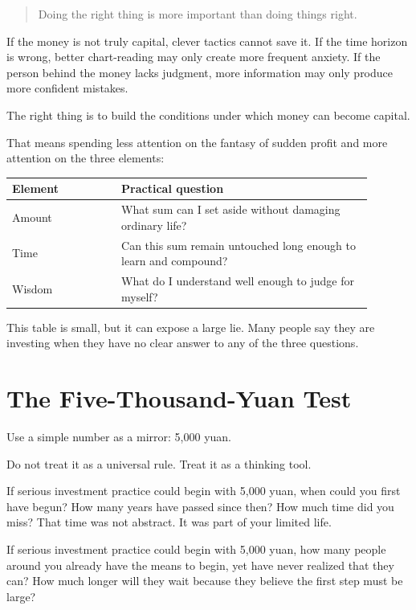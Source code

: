 \begin{quote}
Doing the right thing is more important than doing things right.
\end{quote}

If the money is not truly capital, clever tactics cannot save it. If the time horizon is wrong, better chart-reading may only create more frequent anxiety. If the person behind the money lacks judgment, more information may only produce more confident mistakes.

The right thing is to build the conditions under which money can become capital.

That means spending less attention on the fantasy of sudden profit and more attention on the three elements:

\begin{center}
\begin{tabular}{p{0.27\linewidth}p{0.62\linewidth}}
\hline
Element & Practical question \\
\hline
Amount & What sum can I set aside without damaging ordinary life? \\
Time & Can this sum remain untouched long enough to learn and compound? \\
Wisdom & What do I understand well enough to judge for myself? \\
\hline
\end{tabular}
\end{center}

This table is small, but it can expose a large lie. Many people say they are investing when they have no clear answer to any of the three questions.

\section*{The Five-Thousand-Yuan Test}

Use a simple number as a mirror: 5,000 yuan.

Do not treat it as a universal rule. Treat it as a thinking tool.

If serious investment practice could begin with 5,000 yuan, when could you first have begun? How many years have passed since then? How much time did you miss? That time was not abstract. It was part of your limited life.

If serious investment practice could begin with 5,000 yuan, how many people around you already have the means to begin, yet have never realized that they can? How much longer will they wait because they believe the first step must be large?

